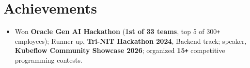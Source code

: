 \documentclass[a4paper,10pt]{article}
\newcommand{\resumeItemListStart}{\begin{justify}\begin{itemize}[leftmargin=3ex, rightmargin=1ex, noitemsep,labelsep=1.2mm,itemsep=0mm,topsep=0.4mm]\small}
\newcommand{\resumeItemListEnd}{\end{itemize}\end{justify}\vspace{-1.5mm}}
\begin{document}
\section{\textbf{Achievements}}
\resumeItemListStart
  \item {Won \textbf{Oracle Gen AI Hackathon} (\textbf{1st of 33 teams}, top 5 of 300\texttt{+} employees); Runner-up, \textbf{Tri-NIT Hackathon 2024}, Backend track; speaker, \textbf{Kubeflow Community Showcase 2026}; organized \textbf{15\texttt{+}} competitive programming contests.}
\resumeItemListEnd

\vspace{-2mm}
\end{document}

